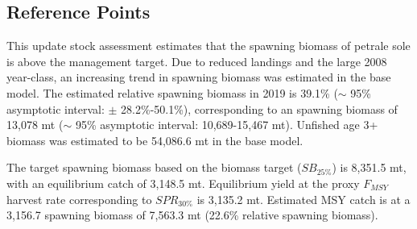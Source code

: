 \documentclass[12pt,]{article}
\begin{document}
\subsection*{Reference Points}\label{reference-points}

This update stock assessment estimates that the spawning biomass of
petrale sole is above the management target. Due to reduced landings and
the large 2008 year-class, an increasing trend in spawning biomass was
estimated in the base model. The estimated relative spawning biomass in
2019 is 39.1\% (\(\sim\) 95\% asymptotic interval: \(\pm\)
28.2\%-50.1\%), corresponding to an spawning biomass of 13,078 mt
(\(\sim\) 95\% asymptotic interval: 10,689-15,467 mt). Unfished age 3+
biomass was estimated to be 54,086.6 mt in the base model.

The target spawning biomass based on the biomass target (\(SB_{25\%}\))
is 8,351.5 mt, with an equilibrium catch of 3,148.5 mt. Equilibrium
yield at the proxy \(F_{MSY}\) harvest rate corresponding to
\(SPR_{30\%}\) is 3,135.2 mt. Estimated MSY catch is at a 3,156.7
spawning biomass of 7,563.3 mt (22.6\% relative spawning biomass).
\end{document}
